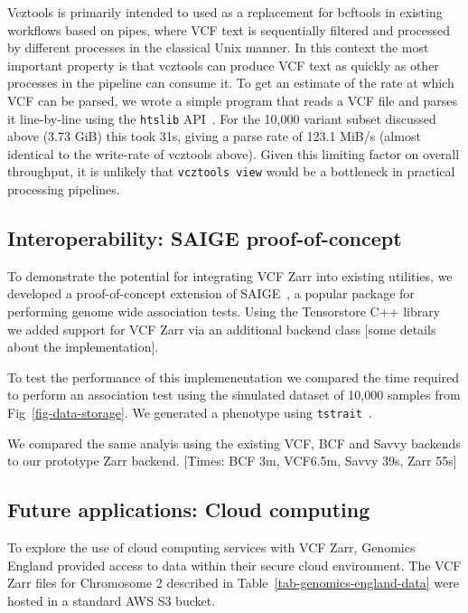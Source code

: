 \documentclass[a4paper,num-refs]{oup-contemporary}
\begin{document}
Vcztools is primarily intended to used as a replacement for bcftools
in existing workflows based on pipes, where VCF text is sequentially
filtered and processed by different processes in the classical
Unix manner. In this context the most important property is that vcztools
can produce VCF text as quickly as other processes in the pipeline can consume
it. To get an estimate of the rate at which VCF can be parsed, we wrote a simple
program that reads a VCF file and parses it line-by-line using the \texttt{htslib}
API~\citep{bonfield2021htslib}. For the 10,000 variant subset discussed
above (3.73 GiB) this took 31s, giving a parse rate of 123.1 MiB/s
(almost identical to the write-rate of vcztools above). Given this limiting
factor on overall throughput,
it is unlikely that \texttt{vcztools view} would be a bottleneck
in practical processing pipelines.

\subsection{Interoperability: SAIGE proof-of-concept}
To demonstrate the potential for integrating VCF Zarr into existing utilities,
we developed a proof-of-concept extension of SAIGE~\cite{zhou2018efficiently,
zhou2020scalable}, a popular package for performing genome wide
association tests. Using the Tensorstore C++ library~\cite{tensorstore}
we added support for VCF Zarr via an additional backend class [some details
about the implementation].

To test the performance of this implemenentation we compared the time required
to perform an association test using the simulated dataset of 10,000 samples
from Fig~\ref{fig-data-storage}. We generated a phenotype using
\texttt{tstrait}~\citep{tagami2024tstrait}.

We compared the same analyis using the existing VCF, BCF and Savvy backends
to our prototype Zarr backend.
[Times: BCF 3m, VCF6.5m, Savvy 39s, Zarr 55s]






\subsection{Future applications: Cloud computing}
To explore the use of cloud computing services with VCF Zarr,
Genomics England provided access to data within their secure
cloud environment. The VCF Zarr files for Chromosome 2
described in Table~\ref{tab-genomics-england-data}
were hosted in a standard AWS S3 bucket.
\end{document}
